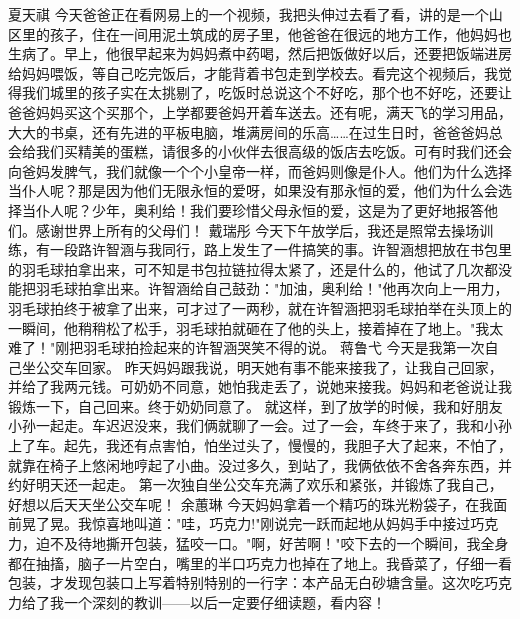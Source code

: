 {}\markdownRendererInterblockSeparator
{}夏天祺\markdownRendererInterblockSeparator
{}今天爸爸正在看网易上的一个视频，我把头伸过去看了看，讲的是一个山区里的孩子，住在一间用泥土筑成的房子里，他爸爸在很远的地方工作，他妈妈也生病了。早上，他很早起来为妈妈煮中药喝，然后把饭做好以后，还要把饭端进房给妈妈喂饭，等自己吃完饭后，才能背着书包走到学校去。看完这个视频后，我觉得我们城里的孩子实在太挑剔了，吃饭时总说这个不好吃，那个也不好吃，还要让爸爸妈妈买这个买那个，上学都要爸妈开着车送去。还有呢，满天飞的学习用品，大大的书桌，还有先进的平板电脑，堆满房间的乐高……在过生日时，爸爸爸妈总会给我们买精美的蛋糕，请很多的小伙伴去很高级的饭店去吃饭。可有时我们还会向爸妈发脾气，我们就像一个个小皇帝一样，而爸妈则像是仆人。他们为什么选择当仆人呢？那是因为他们无限永恒的爱呀，如果没有那永恒的爱，他们为什么会选择当仆人呢？少年，奥利给！我们要珍惜父母永恒的爱，这是为了更好地报答他们。感谢世界上所有的父母们！\markdownRendererInterblockSeparator
{}\markdownRendererInterblockSeparator
{}戴瑞彤\markdownRendererInterblockSeparator
{}今天下午放学后，我还是照常去操场训练，有一段路许智涵与我同行，路上发生了一件搞笑的事。许智涵想把放在书包里的羽毛球拍拿出来，可不知是书包拉链拉得太紧了，还是什么的，他试了几次都没能把羽毛球拍拿出来。许智涵给自己鼓劲："加油，奥利给！"他再次向上一用力，羽毛球拍终于被拿了出来，可才过了一两秒，就在许智涵把羽毛球拍举在头顶上的一瞬间，他稍稍松了松手，羽毛球拍就砸在了他的头上，接着掉在了地上。"我太难了！"刚把羽毛球拍捡起来的许智涵哭笑不得的说。\markdownRendererInterblockSeparator
{}\markdownRendererInterblockSeparator
{}蒋鲁弋\markdownRendererInterblockSeparator
{}今天是我第一次自己坐公交车回家。\markdownRendererInterblockSeparator
{}昨天妈妈跟我说，明天她有事不能来接我了，让我自己回家，并给了我两元钱。可奶奶不同意，她怕我走丢了，说她来接我。妈妈和老爸说让我锻炼一下，自己回来。终于奶奶同意了。\markdownRendererInterblockSeparator
{}就这样，到了放学的时候，我和好朋友小孙一起走。车迟迟没来，我们俩就聊了一会。过了一会，车终于来了，我和小孙上了车。起先，我还有点害怕，怕坐过头了，慢慢的，我胆子大了起来，不怕了，就靠在椅子上悠闲地哼起了小曲。没过多久，到站了，我俩依依不舍各奔东西，并约好明天还一起走。\markdownRendererInterblockSeparator
{}第一次独自坐公交车充满了欢乐和紧张，并锻炼了我自己，好想以后天天坐公交车呢！\markdownRendererInterblockSeparator
{}\markdownRendererInterblockSeparator
{}余蕙琳\markdownRendererInterblockSeparator
{}今天妈妈拿着一个精巧的珠光粉袋子，在我面前晃了晃。我惊喜地叫道："哇，巧克力!"刚说完一跃而起地从妈妈手中接过巧克力，迫不及待地撕开包装，猛咬一口。"啊，好苦啊！"咬下去的一个瞬间，我全身都在抽搐，脑子一片空白，嘴里的半口巧克力也掉在了地上。我昏菜了，仔细一看包装，才发现包装口上写着特别特别的一行字：本产品无白砂塘含量。这次吃巧克力给了我一个深刻的教训------以后一定要仔细读题，看内容！\markdownRendererInterblockSeparator
